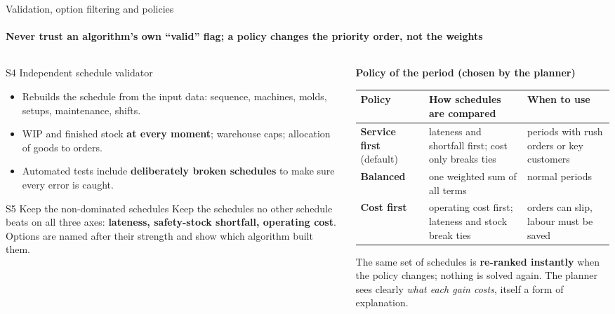 \begin{frame}{Validation, option filtering and policies}
\framesubtitle{Never trust an algorithm's own ``valid'' flag; a policy changes the priority order, not the weights}
\begin{columns}[T]
\begin{column}{0.44\textwidth}
\begin{block}{S4 Independent schedule validator}
\scriptsize
\begin{itemize}\setlength{\itemsep}{0.2em}
  \item Rebuilds the schedule from the input data: sequence, machines, molds, setups, maintenance, shifts.
  \item WIP and finished stock \textbf{at every moment}; warehouse caps; allocation of goods to orders.
  \item Automated tests include \textbf{deliberately broken schedules} to make sure every error is caught.
\end{itemize}
\end{block}
\vspace{-0.2em}
\begin{block}{S5 Keep the non-dominated schedules}
\scriptsize
Keep the schedules no other schedule beats on all three axes: \textbf{lateness, safety-stock shortfall,
operating cost}. Options are named after their strength and show which algorithm built them.
\end{block}
\end{column}
\begin{column}{0.52\textwidth}
\scriptsize
\textbf{Policy of the period (chosen by the planner)}\par\vspace{0.2em}
\begin{tabular}{@{}L{1.8cm}L{2.6cm}L{2.4cm}@{}}
\toprule
Policy & How schedules are compared & When to use\\
\midrule
\textbf{Service first} (default) & lateness and shortfall first; cost only breaks ties & periods with rush orders or key customers\\
\addlinespace
\textbf{Balanced} & one weighted sum of all terms & normal periods\\
\addlinespace
\textbf{Cost first} & operating cost first; lateness and stock break ties & orders can slip, labour must be saved\\
\bottomrule
\end{tabular}
\vspace{0.5em}

The same set of schedules is \textbf{re-ranked instantly} when the policy changes; nothing is solved again.
The planner sees clearly \emph{what each gain costs}, itself a form of explanation.
\end{column}
\end{columns}
\end{frame}

